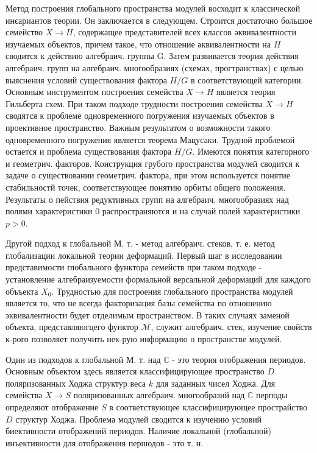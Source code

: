 \documentclass[10pt]{article}
\begin{document}
Метод построения глобального пространства модулей восходит к классической инєариантов теории. Он заключается в следующем. Строится достаточно большое семейство $X \rightarrow H$, содержащее представителей всех классов әквивалентности изучаемых объектов, причем такое, что отношение әквивалентности на $H$ сводится к действию алгебраич. группы G. Затем развивается теория действия алгебраич. групп на алгебраич. многообразиях (схемах, прогтранствах) с целью выяснения условий существования фактора $H / G$ в соответствующей категории. Основным инструментом построения семейства $X \rightarrow H$ является теория Гильберта схем. При таком подходе трудности построения семейства $X \rightarrow H$ сводятся к проблеме одновременного погружения изучаемых объектов в проективное пространство. Важным результатом о возможности такого одновременного погружения является теорема Мацусаки. Трудной проблемой остается и проблема существования фактора $H / G$. Имеются понятия категорного и геометрич. факторов. Конструкция грубого пространства модулей сводится к задаче о существовании геометрич. фактора, при этом используется понятие стабильностй точек, соответствующее понятию орбиты общего положения. Результаты о пействия редуктивных групп на алгебраич. многообразиях над полями характеристики 0 распространяются и на случай полей характеристики $p>0$.



Другой подход к глобальной М. т. - метод алгебраич. стеков, т. е. метод глобализации локальной теории деформаций. Первый шаг в исследовании представимости глобального функтора семейств при таком подходе - установление алгебраизуемости формальной версальной деформаций для каждого объъекта $X_{0}$. Трудностью для построения глобального пространства модулей является то, что не всегда факторизация базы семейства по отношению эквивалентности будет отделимым пространством. В таких случаях заменой объекта, представляюгцего функтор $\mathcal{M}$, служит алгебраич. стек, изучение свойств к-рого позволяет получить нек-рую информацию о пространстве модулей.



Один из подходов к глобальной М. т. над $\mathbb{C}$ - это теория отображения периодов. Основным объектом здесь является классифицирующее пространство $D$ поляризованных Ходжа структур веса $k$ для заданных чисел Ходжа. Для семейства $X \rightarrow S$ поляризованных алгебраич. многообразий над $\mathbb{C}$ перподы определяют отображение $S$ в соответствующее классифицирующее прострайство $D$ структур Ходжа. Проблема модулей сводится к изучению условий биективности отображений периодов. Наличие локальной (глобальной) инъективности для отображения першодов - это т. н.
\end{document}
